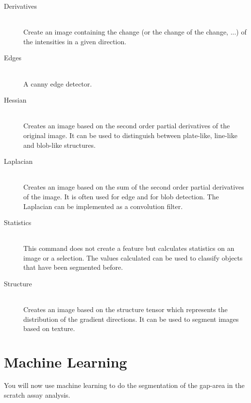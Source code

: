 \begin{description}
 \item[Derivatives] \hfill \\ 
 Create an image containing the change (or the change of the change, ...) of the intensities in a given direction.
 \item[Edges] \hfill \\
 A canny edge detector.
 \item[Hessian] \hfill \\
 Creates an image based on the second order partial derivatives of the original image. It can be used to distinguish between plate-like, line-like and blob-like structures.
 \item[Laplacian] \hfill \\
 Creates an image based on the sum of the second order partial derivatives of the image. It is often used for edge and for blob detection. The Laplacian can be implemented as a convolution filter.
 \item[Statistics] \hfill \\
 This command does not create a feature but calculates statistics on an image or a selection. The values calculated can be used to classify objects that have been segmented before.
  \item[Structure] \hfill \\
Creates an image based on the structure tensor which represents the distribution of the gradient directions. It can be used to segment images based on texture.
\end{description}

\section{Machine Learning}

You will now use machine learning to do the segmentation of the gap-area in the scratch assay analysis. 

